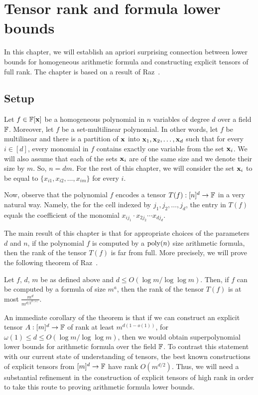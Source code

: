 \chapter{Tensor rank and formula lower bounds}\label{chap:tensorrk}

In this chapter, we will establish an apriori surprising connection between lower bounds for homogeneous arithmetic formula and constructing explicit tensors of full rank. The chapter is based on a result of Raz~\cite{raz10}. 

\section{Setup}
Let $f \in \mathbb{F}[\mathbf{x}]$ be a homogeneous polynomial in $n$ variables of degree $d$ over a field $\mathbb{F}$. Moreover, let $f$ be a set-multilinear polynomial. In other words, let $f$ be multilinear and  there is a partition of $\mathbf{x}$ into $\mathbf{x}_1, \mathbf{x}_2, \ldots, \mathbf{x}_d$ such that for every $i \in [d]$, every monomial in $f$ contains exactly one variable from the set $\mathbf{x}_i$. We will also assume that each of the sets $\mathbf{x}_i$ are of the same size and we denote their size by $m$. So, $n = dm$. For the rest of this chapter, we will consider the set $\mathbf{x}_i$ to be equal to $\{x_{i1}, x_{i2}, \ldots, x_{im}\}$ for every $i$.  

Now, observe that the polynomial $f$ encodes a tensor $T(f):[n]^d \rightarrow \mathbb{F}$ in a very natural way. Namely, the for the cell indexed by $j_1, j_2, \ldots, j_{d}$, the entry in $T(f)$ equals the coefficient of the monomial $x_{ij_1}\cdot x_{2j_2}\cdots x_{dj_d}$. 

The main result of this chapter is that for appropriate choices of the parameters $d$ and $n$, if the polynomial $f$ is computed by a $\operatorname{poly}(n)$ size arithmetic formula, then the rank of the tensor $T(f)$ is far from full. More precisely, we will prove the following theorem of Raz~\cite{raz10}. 

\begin{theorem}\label{thm:tensor rank}
Let $f$, $d$, $m$ be as defined above and  $d \leq O(\log m/\log\log m)$. Then, if $f$ can be computed by a formula of size $m^{a}$, then the rank of the tensor $T(f)$ is at most $\frac{m^{d}}{m^{d/2^{O(a)}}}$. 
\end{theorem}

An immediate corollary of the theorem is that if we can construct an explicit tensor $A:[m]^d\rightarrow \mathbb{F}$ of rank at least $m^{d(1-o(1))}$, for $\omega(1) \leq d \leq O(\log m/\log\log m)$, then we would obtain superpolynomial lower bounds for arithmetic formula over the field $\mathbb{F}$. To contrast this statement with our current state of  understanding of tensors, the best known constructions of explicit tensors from 
$[m]^d\rightarrow \mathbb{F}$ have rank $O(m^{d/2})$. Thus, we will need a substantial refinement in the construction of explicit tensors of high rank in order to take this route to proving arithmetic formula lower bounds. 

